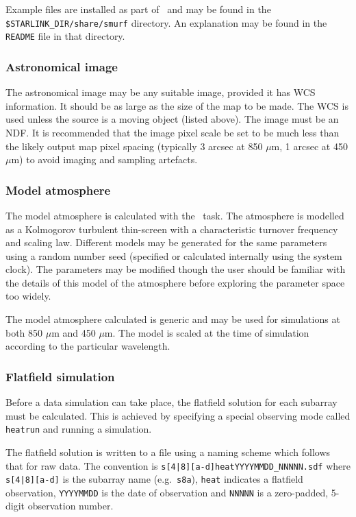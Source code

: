 \documentclass[oneside,11pt]{starlink}
\begin{document}
Example files are installed as part of \SMURF\ and may be found in the
\texttt{\$STARLINK\_DIR/share/smurf} directory. An explanation may be
found in the \texttt{README} file in that directory.

\subsubsection{Astronomical image}

The astronomical image may be any suitable image, provided it has WCS
information. It should be as large as the size of the map to be
made. The WCS is used unless the source is a moving object (listed
above). The image must be an NDF. It is recommended that the image
pixel scale be set to be much less than the likely output map pixel
spacing (typically 3 arcsec at 850 $\mu$m, 1 arcsec at 450 $\mu$m) to
avoid imaging and sampling artefacts.

\subsubsection{Model atmosphere}

The model atmosphere is calculated with the \skynoise\ task. The
atmosphere is modelled as a Kolmogorov turbulent thin-screen
\cite{sc2ana002} with a characteristic turnover frequency and scaling
law. Different models may be generated for the same parameters using a
random number seed (specified or calculated internally using the
system clock). The parameters may be modified though the user should
be familiar with the details of this model of the atmosphere before
exploring the parameter space too widely.

The model atmosphere calculated is generic and may be used for
simulations at both 850 $\mu$m and 450 $\mu$m. The model is scaled
at the time of simulation according to the particular wavelength.

\subsubsection{Flatfield simulation}

Before a data simulation can take place, the flatfield solution for
each subarray must be calculated. This is achieved by specifying a
special observing mode called \texttt{heatrun} and running a
simulation.

The flatfield solution is written to a file using a naming scheme
which follows that for raw data. The convention is
\verb+s[4|8][a-d]heatYYYYMMDD_NNNNN.sdf+ where \verb+s[4|8][a-d]+ is
the subarray name (e.g.\ \verb+s8a+), \verb+heat+ indicates a
flatfield observation, \verb+YYYYMMDD+ is the date of observation and
\verb+NNNNN+ is a zero-padded, 5-digit observation number.
\end{document}
